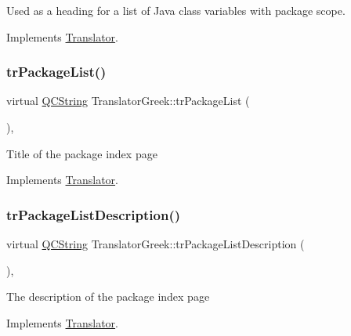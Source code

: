 Used as a heading for a list of Java class variables with package scope. 

Implements \mbox{\hyperlink{class_translator}{Translator}}.

\mbox{\label{class_translator_greek_ab28f5c2db425d1b906d67f5e310f17fd}} 
\subsubsection{\texorpdfstring{trPackageList()}{trPackageList()}}
{\footnotesize\ttfamily virtual \mbox{\hyperlink{class_q_c_string}{Q\+C\+String}} Translator\+Greek\+::tr\+Package\+List (\begin{DoxyParamCaption}{ }\end{DoxyParamCaption})\hspace{0.3cm}{\ttfamily [inline]}, {\ttfamily [virtual]}}

Title of the package index page 

Implements \mbox{\hyperlink{class_translator}{Translator}}.

\mbox{\label{class_translator_greek_a42741f5f19bc980bc37ea978db55fa19}} 
\subsubsection{\texorpdfstring{trPackageListDescription()}{trPackageListDescription()}}
{\footnotesize\ttfamily virtual \mbox{\hyperlink{class_q_c_string}{Q\+C\+String}} Translator\+Greek\+::tr\+Package\+List\+Description (\begin{DoxyParamCaption}{ }\end{DoxyParamCaption})\hspace{0.3cm}{\ttfamily [inline]}, {\ttfamily [virtual]}}

The description of the package index page 

Implements \mbox{\hyperlink{class_translator}{Translator}}.

\mbox{\label{class_translator_greek_a56153559fad2adb2cd88617fdae401c3}} 
